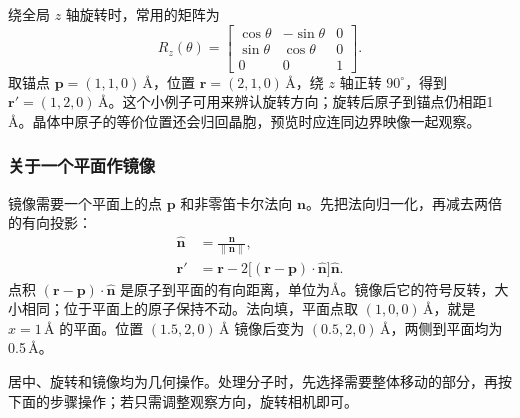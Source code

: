 绕全局 $z$ 轴旋转时，常用的矩阵为
\[
 R_z(\theta)=\begin{bmatrix}
 \cos\theta&-\sin\theta&0\\
 \sin\theta&\cos\theta&0\\
 0&0&1
 \end{bmatrix}.
\]
取锚点 $\mathbf p=(1,1,0)\,\text{\AA}$，位置 $\mathbf r=(2,1,0)\,\text{\AA}$，绕 $z$ 轴正转 $90^\circ$，得到 $\mathbf r'=(1,2,0)\,\text{\AA}$。这个小例子可用来辨认旋转方向；旋转后原子到锚点仍相距1\,\AA。晶体中原子的等价位置还会归回晶胞，预览时应连同边界映像一起观察。

\subsubsection{关于一个平面作镜像}

镜像需要一个平面上的点 $\mathbf p$ 和非零笛卡尔法向 $\mathbf n$。先把法向归一化，再减去两倍的有向投影：
\begin{equation}
 \begin{aligned}
 \hat{\mathbf n}&=\frac{\mathbf n}{\|\mathbf n\|},\\
 \mathbf r'&=\mathbf r-
 2\bigl[(\mathbf r-\mathbf p)\cdot\hat{\mathbf n}\bigr]
       \hat{\mathbf n}.
 \end{aligned}
 \label{eq:mirror-cartesian-plane}
\end{equation}
点积 $(\mathbf r-\mathbf p)\cdot\hat{\mathbf n}$ 是原子到平面的有向距离，单位为\AA。镜像后它的符号反转，大小相同；位于平面上的原子保持不动。法向填，平面点取 $(1,0,0)\,\text{\AA}$，就是 $x=1\,\text{\AA}$ 的平面。位置 $(1.5,2,0)\,\text{\AA}$ 镜像后变为 $(0.5,2,0)\,\text{\AA}$，两侧到平面均为0.5\,\AA。



居中、旋转和镜像均为几何操作。处理分子时，先选择需要整体移动的部分，再按下面的步骤操作；若只需调整观察方向，旋转相机即可。
